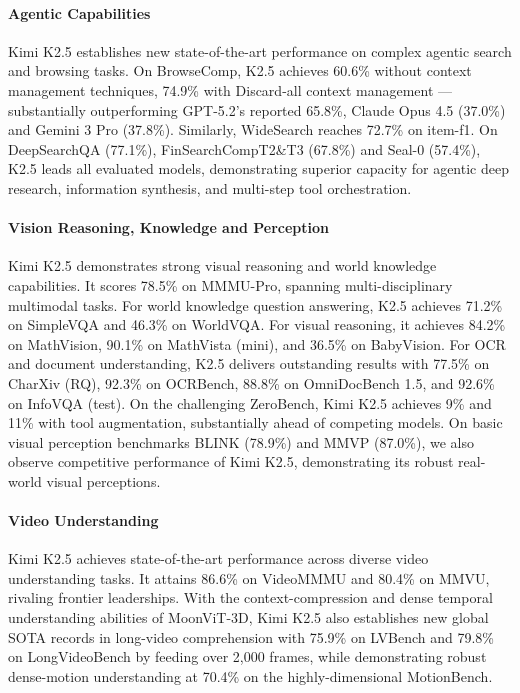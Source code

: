 \paragraph{Agentic Capabilities}
Kimi K2.5 establishes new state-of-the-art performance on complex agentic search and browsing tasks. On BrowseComp, K2.5 achieves 60.6\% without context management techniques, 74.9\% with Discard-all context management \citep{deepseekai2025deepseekv32pushingfrontieropen} — substantially outperforming GPT-5.2's reported 65.8\%, Claude Opus 4.5 (37.0\%) and Gemini 3 Pro (37.8\%). Similarly, WideSearch reaches 72.7\% on item-f1. On DeepSearchQA (77.1\%), FinSearchCompT2\&T3 (67.8\%) and Seal-0 (57.4\%), K2.5 leads all evaluated models, demonstrating superior capacity for agentic deep research, information synthesis, and multi-step tool orchestration.


\paragraph{Vision Reasoning, Knowledge and Perception} Kimi K2.5 demonstrates strong visual reasoning and world knowledge capabilities. It scores 78.5\% on MMMU-Pro, spanning multi-disciplinary multimodal tasks. For world knowledge question answering, K2.5 achieves 71.2\% on SimpleVQA and 46.3\% on WorldVQA. For visual reasoning, it achieves 84.2\% on MathVision, 90.1\% on MathVista (mini), and 36.5\% on BabyVision. For OCR and document understanding, K2.5 delivers outstanding results with 77.5\% on CharXiv (RQ), 92.3\% on OCRBench, 88.8\% on OmniDocBench 1.5, and 92.6\% on InfoVQA (test). On the challenging ZeroBench, Kimi K2.5 achieves 9\% and 11\% with tool augmentation, substantially ahead of competing models. On basic visual perception benchmarks BLINK (78.9\%) and MMVP (87.0\%), we also observe competitive performance of Kimi K2.5, demonstrating its robust real-world visual perceptions.

\paragraph{Video Understanding} Kimi K2.5 achieves state-of-the-art performance across diverse video understanding tasks. It attains 86.6\% on VideoMMMU and 80.4\% on MMVU, rivaling frontier leaderships. With the context-compression and dense temporal understanding abilities of MoonViT-3D, Kimi K2.5 also establishes new global SOTA records in long-video comprehension with 75.9\% on LVBench and 79.8\% on LongVideoBench by feeding over 2,000 frames, while demonstrating robust dense-motion understanding at 70.4\% on the highly-dimensional MotionBench.



